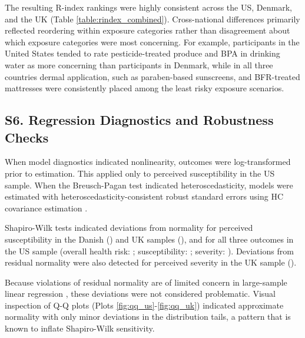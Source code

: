 The resulting R-index rankings were highly consistent across the US, Denmark, and the UK (Table \ref{table:rindex_combined}). Cross-national differences primarily reflected reordering within exposure categories rather than disagreement about which exposure categories were most concerning. For example, participants in the United States tended to rate pesticide-treated produce and BPA in drinking water as more concerning than participants in Denmark, while in all three countries dermal application, such as paraben-based sunscreens, and BFR-treated mattresses were consistently placed among the least risky exposure scenarios.



\subsection{S6. Regression Diagnostics and Robustness Checks}

When model diagnostics indicated nonlinearity, outcomes were log-transformed prior to estimation. This applied only to perceived susceptibility in the US sample. When the Breusch-Pagan test indicated heteroscedasticity, models were estimated with heteroscedasticity-consistent robust standard errors using HC covariance estimation \citep{hayes2007using,long2000using,wilcox2011introduction}.

Shapiro-Wilk tests indicated deviations from normality for perceived susceptibility in the Danish () and UK samples (), and for all three outcomes in the US sample (overall health risk: ; susceptibility: ; severity: ). Deviations from residual normality were also detected for perceived severity in the UK sample ().

Because violations of residual normality are of limited concern in large-sample linear regression \citep{knief2021violating,gelman2007data}, these deviations were not considered problematic. Visual inspection of Q-Q plots (Plots \ref{fig:qq_us}-\ref{fig:qq_uk}) indicated approximate normality with only minor deviations in the distribution tails, a pattern that is known to inflate Shapiro-Wilk sensitivity.

